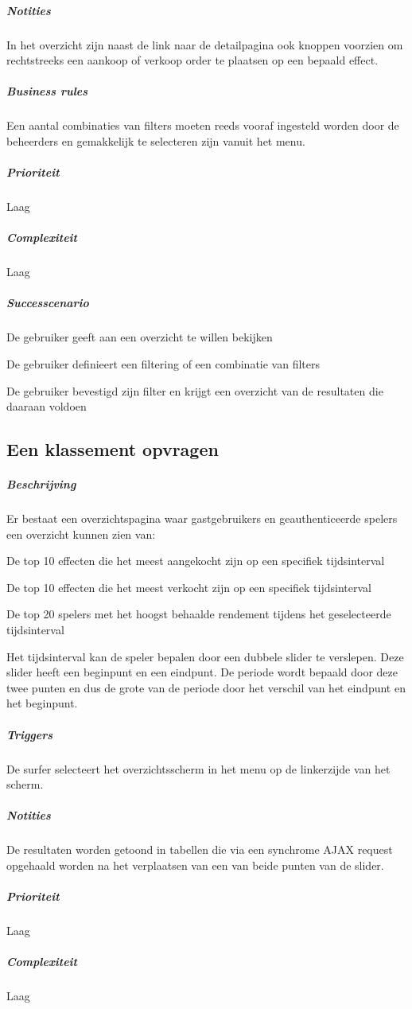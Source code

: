 \begin{compact}
\subparagraph{Notities}In het overzicht zijn naast de link naar de detailpagina ook knoppen voorzien om rechtstreeks een aankoop of verkoop order te plaatsen op een bepaald effect.
\subparagraph{Business rules}Een aantal combinaties van filters moeten reeds vooraf ingesteld worden door de beheerders en gemakkelijk te selecteren zijn vanuit het menu.
\subparagraph{Prioriteit}Laag
\subparagraph{Complexiteit}Laag
\subparagraph{Successcenario}
\begin{enumerate_compact}
 \item De gebruiker geeft aan een overzicht te willen bekijken
 \item De gebruiker definieert een filtering of een combinatie van filters
 \item De gebruiker bevestigd zijn filter en krijgt een overzicht van de resultaten die daaraan voldoen
\end{enumerate_compact}
\end{compact}

\subsection{Een klassement opvragen}
\begin{compact}

\subparagraph{Beschrijving} Er bestaat een overzichtspagina waar gastgebruikers en geauthenticeerde spelers een overzicht kunnen zien van:
\begin{itemize_compact}
	\item De top 10 effecten die het meest aangekocht zijn op een specifiek tijdsinterval
	\item De top 10 effecten die het meest verkocht zijn op een specifiek tijdsinterval
	\item De top 20 spelers met het hoogst behaalde rendement tijdens het geselecteerde tijdsinterval
\end{itemize_compact}
Het tijdsinterval kan de speler bepalen door een dubbele slider te verslepen. Deze slider heeft een beginpunt en een eindpunt. De periode wordt bepaald door deze twee punten en dus de grote van de periode door het verschil van het eindpunt en het beginpunt.
\subparagraph{Triggers} De surfer selecteert het overzichtsscherm in het menu op de linkerzijde van het scherm.
\subparagraph{Notities} De resultaten worden getoond in tabellen die via een synchrome AJAX request opgehaald worden na het verplaatsen van een van beide punten van de slider.
\subparagraph{Prioriteit}Laag
\subparagraph{Complexiteit}Laag
\end{compact}

